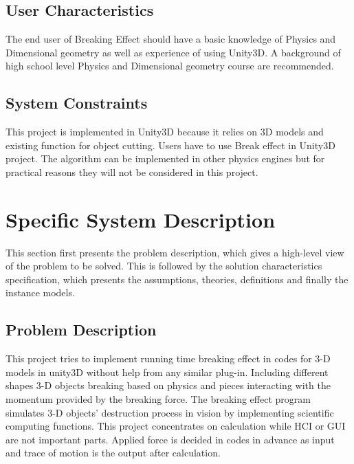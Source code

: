 \documentclass[12pt]{article}
\newcommand{\progname}{Breaking Effect} %
\begin{document}
	\subsection{User Characteristics} \label{SecUserCharacteristics}
	
	The end user of \progname{} should have a basic knowledge of Physics and Dimensional geometry as well as experience of using Unity3D. A background of high school level Physics and Dimensional geometry course are recommended. 
	
	\subsection{System Constraints}
	
	This project is implemented in Unity3D because it relies on 3D models and existing function for object cutting. Users have to use Break effect in Unity3D project. The algorithm can be implemented in other physics engines but for practical reasons they will not be considered in this project.  
	
	\section{Specific System Description}
	
	This section first presents the problem description, which gives a high-level
	view of the problem to be solved.  This is followed by the solution characteristics
	specification, which presents the assumptions, theories, definitions and finally
	the instance models. 
	
	\subsection{Problem Description} \label{Sec_pd}
	
	This project tries to implement running time breaking effect in codes for 3-D models in unity3D without help from any similar plug-in. Including different shapes 3-D objects breaking based on physics and pieces interacting with the momentum provided by the breaking force. The breaking effect program simulates 3-D objects’ destruction process in vision by implementing scientific computing functions. This project concentrates on calculation while HCI or GUI are not important parts. Applied force is decided in codes in advance as input and trace of motion is the output after calculation.
	
\end{document}
